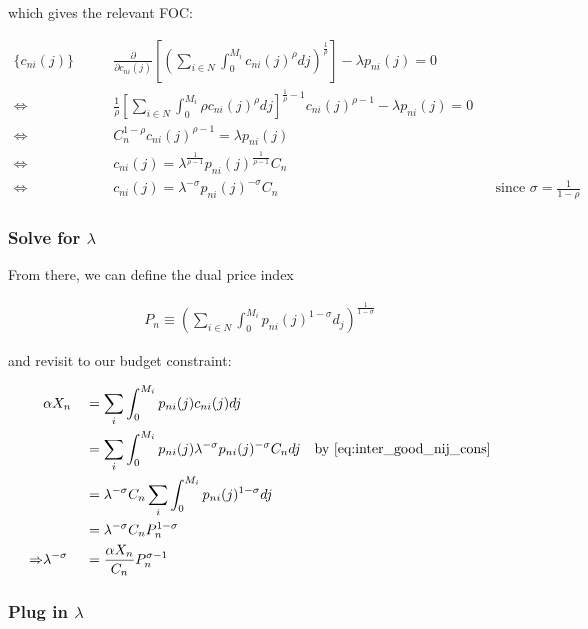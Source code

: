 \documentclass[10pt]{article}
\begin{document}
which gives the relevant FOC:

\begin{align}
    \{c_{n i}(j)\} \quad \quad &\frac{\partial}{\partial c_{n i}(j)} \left[\left(\sum_{i \in N} \int_0^{M_i} c_{n i}(j)^\rho d j\right)^{\frac{1}{\rho}}\right] - \lambda p_{n i}(j) = 0 \\
    \Leftrightarrow & \frac{1}{\rho} \left[\sum_{i \in N} \int_0^{M_i} \rho c_{n i}(j)^\rho d j\right]^{\frac{1}{\rho}-1} c_{n i}(j)^{\rho-1} - \lambda p_{n i}(j) = 0 \\
    \Leftrightarrow & C_n^{1-\rho} c_{n i}(j)^{\rho-1} = \lambda p_{n i}(j) \\
    \Leftrightarrow & c_{n i}(j) = \lambda^{\frac{1}{\rho -1}} p_{ni}(j)^{\frac{1}{\rho -1}} C_n \\ 
    \Leftrightarrow & c_{n i}(j) = \lambda^{-\sigma} p_{ni}(j)^{-\sigma} C_n && \text{since $\sigma = \frac{1}{1-\rho}$} \label{eq:inter_good_nij_cons}
\end{align}


\subsubsection{Solve for $\lambda$}

From there, we can define the dual price index 

\begin{align}
    P_n \equiv \left(\sum_{i \in N} \int_0^{M_i} p_{n i}(j)^{1-\sigma} d_j \right)^{\frac{1}{1-\sigma}} \label{eq:price_index_p_n}
\end{align}

and revisit to our budget constraint:

\begin{alignat}{2}
    &\alpha X_n && = \sum_i \int_{0}^{M_i} p_{n i}(j) c_{n i}(j) d j \\
    &&&= \sum_i \int_{0}^{M_i} p_{n i}(j) \lambda^{-\sigma} p_{ni}(j)^{-\sigma} C_n d j \quad \text{by \eqref{eq:inter_good_nij_cons}} \\
    &&&= \lambda^{-\sigma} C_n \sum_i \int_{0}^{M_i} p_{n i}(j)^{1-\sigma} d j \\
    &&& = \lambda^{-\sigma} C_n P_n^{1-\sigma} \\
    \Rightarrow &\lambda^{-\sigma} &&= \frac{\alpha X_n}{C_n} P_n^{\sigma-1} \\
\end{alignat}

\subsubsection{Plug in $\lambda$}
\end{document}
